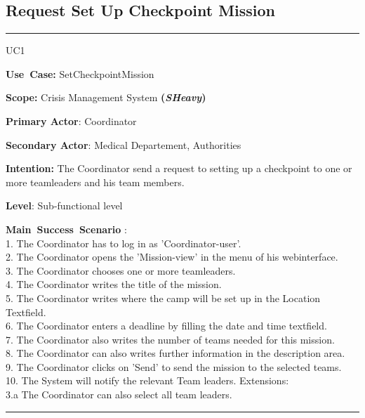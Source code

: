 \subsection{Request Set Up Checkpoint Mission}
\vspace{0.5cm}
\hrule
\vspace{0.5cm}
\begin{lyxlist}{UC1}
\small{
\item [\textbf{Use~Case:}] SetCheckpointMission
\item [\textbf{Scope:}] Crisis Management System \textbf{(\emph{SHeavy})}
\item [\textbf{Primary Actor}:] Coordinator
\item [\textbf{Secondary Actor}:] Medical Departement, Authorities
\item [\textbf{Intention:}]The Coordinator send a request to setting up a
checkpoint to one or more teamleaders and his team members.
\item [\textbf{Level}:]Sub-functional level
\item [\textbf{Main~Success~Scenario}]:\\
1. The Coordinator has to log in as 'Coordinator-user'.\\
2. The Coordinator opens the 'Mission-view' in the menu of his webinterface.\\
3. The Coordinator chooses one or more teamleaders.\\
4. The Coordinator writes the title of the mission.\\
5. The Coordinator writes where the camp will be set up in the Location
Textfield.\\
6. The Coordinator enters a deadline by filling the date and time textfield.\\
7. The Coordinator also writes the number of teams needed for this mission.\\
8. The Coordinator can also writes further information in the description
area.\\
9. The Coordinator clicks on 'Send' to send the mission to the selected
teams.\\
10. The System will notify the relevant Team leaders.
Extensions:\\
	3.a The Coordinator can also select all team leaders.\\
}
\end{lyxlist}
\hrule 
\vspace{0.5cm} 


